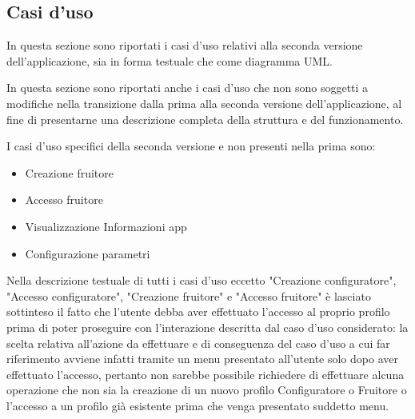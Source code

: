 \subsection{Casi d'uso}
In questa sezione sono riportati i casi d'uso relativi alla seconda versione dell'applicazione, sia in forma testuale che come diagramma UML.\bigskip 

In questa sezione sono riportati anche i casi d'uso che non sono soggetti a modifiche nella transizione dalla prima alla seconda versione dell'applicazione, al fine di presentarne una descrizione completa della struttura e del funzionamento.\bigskip

I casi d'uso specifici della seconda versione e non presenti nella prima sono:
\begin{itemize}
    \item Creazione fruitore
    \item Accesso fruitore
    \item Visualizzazione Informazioni app
    \item Configurazione parametri
\end{itemize} \bigskip

Nella descrizione testuale di tutti i casi d'uso eccetto "Creazione configuratore", "Accesso configuratore", "Creazione fruitore" e "Accesso fruitore" è lasciato sottinteso il fatto che l'utente debba aver effettuato l'accesso al proprio profilo prima di poter proseguire con l'interazione descritta dal caso d'uso considerato: la scelta relativa all'azione da effettuare e di conseguenza del caso d'uso a cui far riferimento avviene infatti tramite un menu presentato all'utente solo dopo aver effettuato l'accesso, pertanto non sarebbe possibile richiedere di effettuare alcuna operazione che non sia la creazione di un nuovo profilo Configuratore o Fruitore o l'accesso a un profilo già esistente prima che venga presentato suddetto menu.\bigskip












